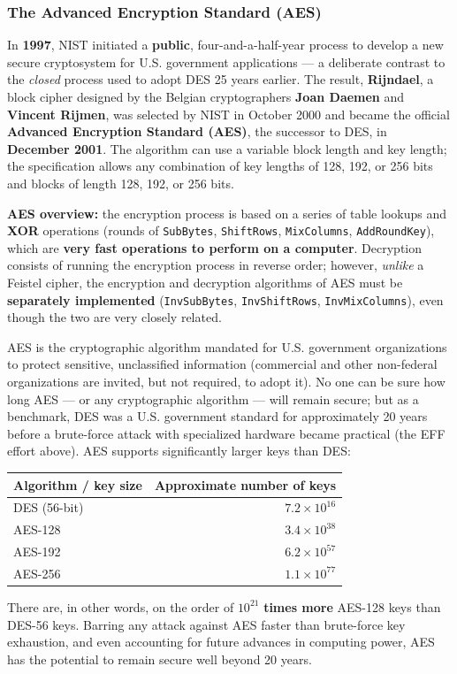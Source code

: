 \documentclass[12pt, a4paper]{article}
\begin{document}
\subsubsection{The Advanced Encryption Standard (AES)}
\label{subsec:aes-04}
In \textbf{1997}, NIST initiated a \textbf{public}, four-and-a-half-year process to develop a new secure cryptosystem for U.S. government applications --- a deliberate contrast to the \emph{closed} process used to adopt DES 25 years earlier. The result, \textbf{Rijndael}, a block cipher designed by the Belgian cryptographers \textbf{Joan Daemen} and \textbf{Vincent Rijmen}, was selected by NIST in October 2000 and became the official \textbf{Advanced Encryption Standard (AES)}, the successor to DES, in \textbf{December 2001}. The algorithm can use a variable block length and key length; the specification allows any combination of key lengths of 128, 192, or 256 bits and blocks of length 128, 192, or 256 bits.

\textbf{AES overview:} the encryption process is based on a series of table lookups and \textbf{XOR} operations (rounds of \texttt{SubBytes}, \texttt{ShiftRows}, \texttt{MixColumns}, \texttt{AddRoundKey}), which are \textbf{very fast operations to perform on a computer}. Decryption consists of running the encryption process in reverse order; however, \emph{unlike} a Feistel cipher, the encryption and decryption algorithms of AES must be \textbf{separately implemented} (\texttt{InvSubBytes}, \texttt{InvShiftRows}, \texttt{InvMixColumns}), even though the two are very closely related.

AES is the cryptographic algorithm mandated for U.S. government organizations to protect sensitive, unclassified information (commercial and other non-federal organizations are invited, but not required, to adopt it). No one can be sure how long AES --- or any cryptographic algorithm --- will remain secure; but as a benchmark, DES was a U.S. government standard for approximately 20 years before a brute-force attack with specialized hardware became practical (the EFF effort above). AES supports significantly larger keys than DES:

\begin{center}
\begin{tabular}{@{}lr@{}}
\toprule
\textbf{Algorithm / key size} & \textbf{Approximate number of keys} \\
\midrule
DES (56-bit) & $7.2 \times 10^{16}$ \\
AES-128 & $3.4 \times 10^{38}$ \\
AES-192 & $6.2 \times 10^{57}$ \\
AES-256 & $1.1 \times 10^{77}$ \\
\bottomrule
\end{tabular}
\end{center}
There are, in other words, on the order of $10^{21}$ \textbf{times more} AES-128 keys than DES-56 keys. Barring any attack against AES faster than brute-force key exhaustion, and even accounting for future advances in computing power, AES has the potential to remain secure well beyond 20 years.
\end{document}
